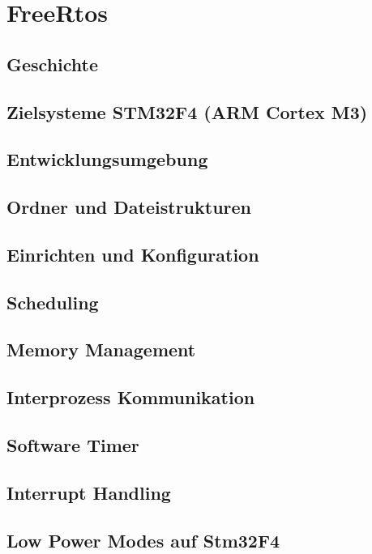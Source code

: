 \documentclass[ngerman]{seminarvorlage}
\begin{document}
\section{FreeRtos} 
\subsection{Geschichte}
\subsection{Zielsysteme STM32F4 (ARM Cortex M3)}
\subsection{Entwicklungsumgebung}
\subsection{Ordner und Dateistrukturen} 
\subsection{Einrichten und Konfiguration}
\subsection{Scheduling}
\subsection{Memory Management}
\subsection{Interprozess Kommunikation}
\subsection{Software Timer}
\subsection{Interrupt Handling}
\subsection{Low Power Modes auf Stm32F4}
\label{sec:Low Power Modes} 
\end{document}
